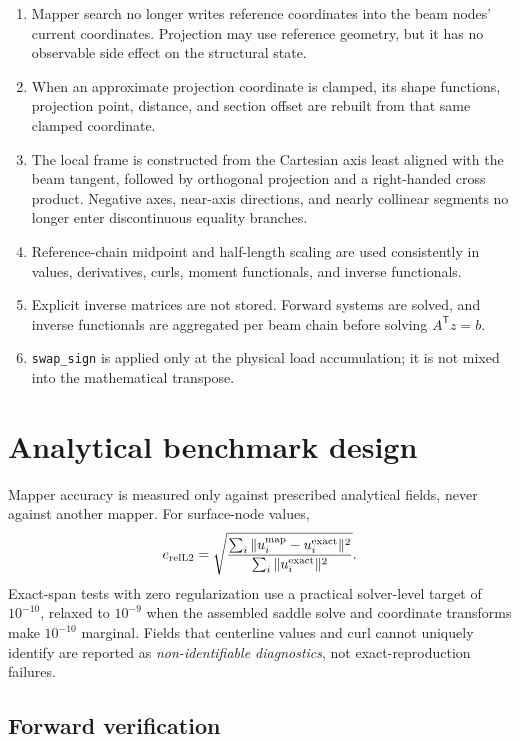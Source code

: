 \documentclass[11pt,a4paper]{article}
\newcommand{\T}{\mathsf{T}}
\begin{document}
\begin{enumerate}
\item Mapper search no longer writes reference coordinates into the beam
      nodes' current coordinates.  Projection may use reference geometry,
      but it has no observable side effect on the structural state.
\item When an approximate projection coordinate is clamped, its shape
      functions, projection point, distance, and section offset are rebuilt
      from that same clamped coordinate.
\item The local frame is constructed from the Cartesian axis least aligned
      with the beam tangent, followed by orthogonal projection and a
      right-handed cross product.  Negative axes, near-axis directions, and
      nearly collinear segments no longer enter discontinuous equality
      branches.
\item Reference-chain midpoint and half-length scaling are used consistently
      in values, derivatives, curls, moment functionals, and inverse
      functionals.
\item Explicit inverse matrices are not stored.  Forward systems are solved,
      and inverse functionals are aggregated per beam chain before solving
      \(A^\T z=b\).
\item \texttt{swap\_sign} is applied only at the physical load accumulation;
      it is not mixed into the mathematical transpose.
\end{enumerate}

\section{Analytical benchmark design}

Mapper accuracy is measured only against prescribed analytical fields, never
against another mapper.  For surface-node values,
\[
 e_{\rm relL2}=
 \sqrt{\frac{\sum_i\|u_i^{\rm map}-u_i^{\rm exact}\|^2}
              {\sum_i\|u_i^{\rm exact}\|^2}}.
\]
Exact-span tests with zero regularization use a practical solver-level target
of \(10^{-10}\), relaxed to \(10^{-9}\) when the assembled saddle solve and
coordinate transforms make \(10^{-10}\) marginal.  Fields that centerline
values and curl cannot uniquely identify are reported as
\emph{non-identifiable diagnostics}, not exact-reproduction failures.

\subsection{Forward verification}
\end{document}
